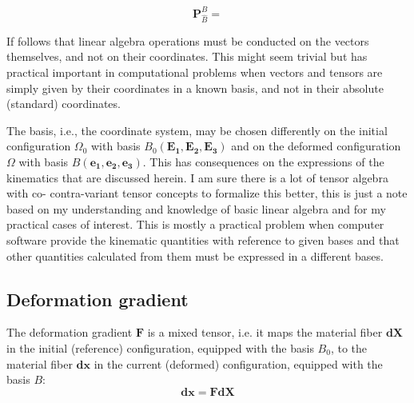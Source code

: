 \documentclass[letterpaper,12pt,oneside]{report}
\begin{document}
\begin{equation}
\mathbf{P}_{\hat{B}}^B = 
\end{equation}


If follows that linear algebra operations must be conducted on the vectors themselves, and not on their coordinates. This might seem trivial but has practical important in computational problems when vectors and tensors are simply given by their coordinates in a known basis, and not in their absolute (standard) coordinates.


The basis, i.e., the coordinate system, may be chosen differently on the initial configuration $\Omega_0$ with basis $B_0(\mathbf{E_1},\mathbf{E_2},\mathbf{E_3})$ and on the deformed configuration $\Omega$ with basis $B(\mathbf{e_1},\mathbf{e_2},\mathbf{e_3})$. This has consequences on the expressions of the kinematics that are discussed herein. I am sure there is a lot of tensor algebra with co- contra-variant tensor concepts to formalize this better, this is just a note based on my understanding and knowledge of basic linear algebra and for my practical cases of interest. This is mostly a practical problem when computer software provide the kinematic quantities with reference to given bases and that other quantities calculated from them must be expressed in a different bases.

\subsection{Deformation gradient}
The deformation gradient $\mathbf{F}$ is a mixed tensor, i.e. it maps the material fiber $\mathbf{dX}$ in the initial (reference) configuration, equipped with the basis $B_0$, to the material fiber $\mathbf{dx}$ in the current (deformed) configuration, equipped with the basis $B$:
\begin{equation}
\mathbf{dx} = \mathbf{F} \mathbf{dX}
\label{eq:F}
\end{equation}
\end{document}
